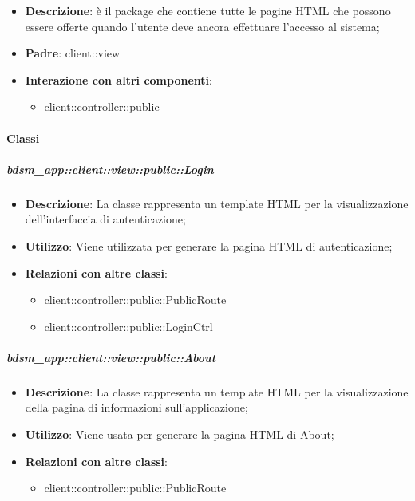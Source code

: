 \begin{itemize}
	\item \textbf{Descrizione}: è il package che contiene tutte le pagine HTML che possono essere offerte quando l'utente deve ancora effettuare l'accesso al sistema;
	\item \textbf{Padre}: client::view
	\item \textbf{Interazione con altri componenti}:
		\begin{itemize}
			\item client::controller::public
		\end{itemize}
\end{itemize}

	\paragraph{Classi} %
		\subparagraph{bdsm\_app::client::view::public::Login} %
		\label{subp:bdsm_app_client_view_public_login}
			\begin{itemize}
				\item \textbf{Descrizione}: La classe rappresenta un template HTML per la visualizzazione dell'interfaccia di autenticazione;
				\item \textbf{Utilizzo}: Viene utilizzata per generare la pagina HTML di autenticazione;
				\item \textbf{Relazioni con altre classi}:
					\begin{itemize}
						\item client::controller::public::PublicRoute
						\item client::controller::public::LoginCtrl
					\end{itemize}
			\end{itemize}

		\subparagraph{bdsm\_app::client::view::public::About} %
		\label{subp:bdsm_app_client_view_public_about}
			\begin{itemize}
				\item \textbf{Descrizione}: La classe rappresenta un template HTML per la visualizzazione della pagina di informazioni sull'applicazione;
				\item \textbf{Utilizzo}: Viene usata per generare la pagina HTML di About;
				\item \textbf{Relazioni con altre classi}:
					\begin{itemize}
						\item client::controller::public::PublicRoute
					\end{itemize}
			\end{itemize}

